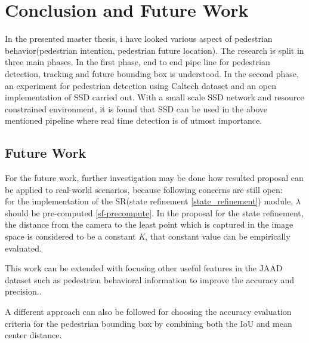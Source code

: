 
\chapter{Conclusion and Future Work}
In the presented master thesis, i have looked various aspect of pedestrian behavior(pedestrian intention, pedestrian future location). The research is split in three main phases. In the first phase, end to end pipe line for pedestrian detection, tracking and future bounding box is understood. In the second phase, an experiment for pedestrian detection using Caltech dataset and an open implementation of SSD carried out. With a small scale SSD network and resource constrained environment, it is found that SSD can be used in the above mentioned pipeline where real time detection is of utmost importance.


\section{Future Work}
For the future work, further investigation may be done how resulted proposal can be applied to real-world scenarios, because following concerns are still open: \\
for the implementation of the SR(state refinement \ref{state_refinement}) module, $\lambda$ should be pre-computed \ref{sf-precompute}. In the proposal for the state refinement, the distance from the camera to the least point which is captured in the image space is considered to be a constant \textit{K}, that constant value can be empirically evaluated.

This work can be extended with focusing other useful features in the JAAD dataset such as pedestrian behavioral information to improve the accuracy and precision..

A different approach can also be followed for choosing the accuracy evaluation criteria for the pedestrian bounding box by combining both the IoU and mean center distance.
